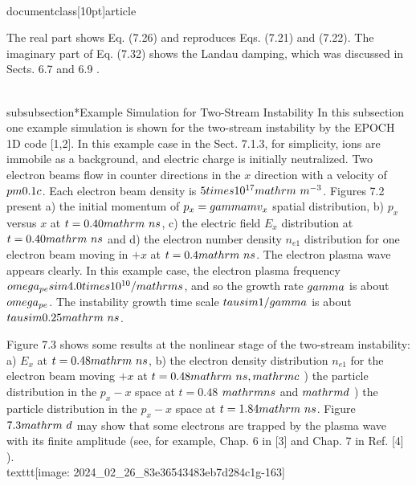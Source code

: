 \\documentclass[10pt]{article}
\begin{document}
{{{{The real part shows Eq. (7.26) and reproduces Eqs. (7.21) and (7.22). The imaginary part of Eq. (7.32) shows the Landau damping, which was discussed in Sects. 6.7 and 6.9 .

\\subsubsection*{Example Simulation for Two-Stream Instability}
In this subsection one example simulation is shown for the two-stream instability by the EPOCH 1D code [1,2]. In this example case in the Sect. 7.1.3, for simplicity, ions are immobile as a background, and electric charge is initially neutralized. Two electron beams flow in counter directions in the $x$ direction with a velocity of $\\pm 0.1 c$. Each electron beam density is $5 \\times 10^{17} \\mathrm{~m}^{-3}$. Figures 7.2 present a) the initial momentum of $p_{x}=\\gamma m v_{x}$ spatial distribution, b) $p_{x}$ versus $x$ at $t=0.40 \\mathrm{~ns}$, c) the electric field $E_{x}$ distribution at $t=0.40 \\mathrm{~ns}$ and d) the electron number density $n_{e 1}$ distribution for one electron beam moving in $+x$ at $t=0.4 \\mathrm{~ns}$. The electron plasma wave appears clearly. In this example case, the electron plasma frequency $\\omega_{p e} \\sim 4.0 \\times 10^{10} / \\mathrm{s}$, and so the growth rate $\\gamma$ is about $\\omega_{p e}$. The instability growth time scale $\\tau \\sim 1 / \\gamma$ is about $\\tau \\sim 0.25 \\mathrm{~ns}$.

Figure 7.3 shows some results at the nonlinear stage of the two-stream instability: a) $E_{x}$ at $t=0.48 \\mathrm{~ns}$, b) the electron density distribution $n_{e 1}$ for the electron beam moving $+x$ at $t=0.48 \\mathrm{~ns}, \\mathrm{c}$ ) the particle distribution in the $p_{x}-x$ space at $t=0.48$ $\\mathrm{ns}$ and $\\mathrm{d}$ ) the particle distribution in the $p_{x}-x$ space at $t=1.84 \\mathrm{~ns}$. Figure $7.3 \\mathrm{~d}$ may show that some electrons are trapped by the plasma wave with its finite amplitude (see, for example, Chap. 6 in [3] and Chap. 7 in Ref. [4] ).
\\texttt{[image: 2024\_02\_26\_83e36543483eb7d284c1g-163]}

}}}}
\end{document}
